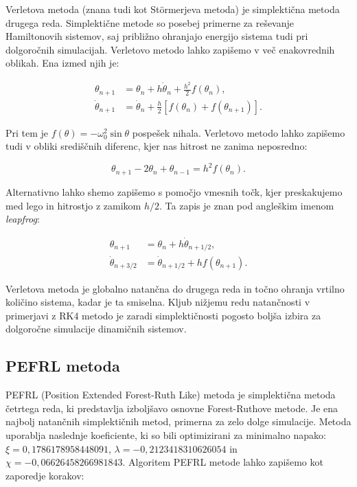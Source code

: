 \documentclass[12pt,a4paper]{article}
\begin{document}
Verletova metoda (znana tudi kot Störmerjeva metoda) je simplektična metoda drugega reda. Simplektične metode so posebej primerne za reševanje Hamiltonovih sistemov, saj približno ohranjajo energijo sistema tudi pri dolgoročnih simulacijah. Verletovo metodo lahko zapišemo v več enakovrednih oblikah. Ena izmed njih je:

\begin{align}
\theta_{n+1} &= \theta_n + h \dot{\theta}_n + \frac{h^2}{2} f(\theta_n), \\
\dot{\theta}_{n+1} &= \dot{\theta}_n + \frac{h}{2} [f(\theta_n) + f(\theta_{n+1})].
\end{align}

Pri tem je $f(\theta) = -\omega_0^2 \sin\theta$ pospešek nihala. Verletovo metodo lahko zapišemo tudi v obliki središčnih diferenc, kjer nas hitrost ne zanima neposredno:

\begin{equation}
\theta_{n+1} - 2\theta_n + \theta_{n-1} = h^2 f(\theta_n).
\end{equation}

Alternativno lahko shemo zapišemo s pomočjo vmesnih točk, kjer preskakujemo med lego in hitrostjo z zamikom $h/2$. Ta zapis je znan pod angleškim imenom \textit{leapfrog}:

\begin{align}
\theta_{n+1} &= \theta_n + h \dot{\theta}_{n+1/2}, \\
\dot{\theta}_{n+3/2} &= \dot{\theta}_{n+1/2} + h f(\theta_{n+1}).
\end{align}

Verletova metoda je globalno natančna do drugega reda in točno ohranja vrtilno količino sistema, kadar je ta smiselna. Kljub nižjemu redu natančnosti v primerjavi z RK4 metodo je zaradi simplektičnosti pogosto boljša izbira za dolgoročne simulacije dinamičnih sistemov.

\subsection{PEFRL metoda}

PEFRL (Position Extended Forest-Ruth Like) metoda je simplektična metoda četrtega reda, ki predstavlja izboljšavo osnovne Forest-Ruthove metode. Je ena najbolj natančnih simplektičnih metod, primerna za zelo dolge simulacije. Metoda uporablja naslednje koeficiente, ki so bili optimizirani za minimalno napako: $\xi = 0,1786178958448091$, $\lambda = -0,2123418310626054$ in $\chi = -0,06626458266981843$. Algoritem PEFRL metode lahko zapišemo kot zaporedje korakov:
\end{document}
